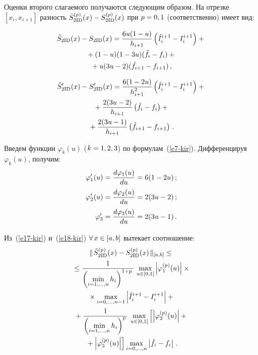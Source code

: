 \begin{multicols}{2}
  Оценки второго слагаемого получаются следующим образом. На отрезке 
$[x_i,x_{i+1}]$ разность $\tilde{S}^{(p)}_{2\mathrm{ID}}(x)\hm- S_{2\mathrm{ID}}^{(p)}(x)$ при 
$p\hm=0,1$ (соответственно) имеет вид:

\noindent 
  \begin{multline}
  \tilde{S}_{2\mathrm{ID}}(x) -S_{2\mathrm{ID}}(x) = \displaystyle\frac{\displaystyle 6u(1-u)\mathstrut}{\displaystyle h_{i+1}\mathstrut}\left( \hat{I}_i^{i+1} -
I_i^{i+1}\right) +{}\\
  {}+ (1-u)(1-3u) (\tilde{f}_i-f_i) +{}\\
  {}+u(3u-2) (\tilde{f}_{i+1}-f_{i+1})\,,
  \label{e17-kir}
  \end{multline}
  
  \vspace*{-12pt}
  
  \noindent
  \begin{multline}
  \tilde{S}^\prime_{2\mathrm{ID}}(x) -S^\prime_{2\mathrm{ID}}(x) = \displaystyle\frac{\displaystyle 6(1-2u)\mathstrut}{\displaystyle h^2_{i+1}\mathstrut}\left( 
\hat{I}_i^{i+1}-I_i^{i+1}\right) +{}\\
  {}+ \displaystyle\frac{\displaystyle 2(3u-2)\mathstrut}{\displaystyle h_{i+1}\mathstrut}\left(\tilde{f}_i-f_i\right) +{}\\
  {}+\displaystyle\frac{\displaystyle 2(3u-1)\mathstrut}{\displaystyle h_{i+1}\mathstrut} \left( 
\tilde{f}_{i+1}-f_{i+1}\right)\,.
  \label{e18-kir}
  \end{multline}

Введем функции $\varphi_k(u)$ ($k\hm=1,2,3$) по формулам~(\ref{e7-kir}). 
Дифференцируя $\varphi_k(u)$, получим:
\begin{align*}
\varphi_1^\prime(u) &= \displaystyle\frac{\displaystyle d\varphi_1(u)\mathstrut}{\displaystyle du\mathstrut}=6(1-2u)\,;\\
\varphi^\prime_2(u) &= \displaystyle\frac{\displaystyle d\varphi_2(u)\mathstrut}{\displaystyle du\mathstrut}=2(3u-2)\,;\\
\varphi^\prime_3 &= \displaystyle\frac{\displaystyle d\varphi_3(u)\mathstrut}{\displaystyle du\mathstrut}=2(3u-1)\,.
\end{align*}

Из~(\ref{e17-kir}) и~(\ref{e18-kir}) $\forall\,x \hm\in [a,b]$ вытекает 
соотношение: 
\begin{multline}
\parallel\! \tilde{S}^{(p)}_{2\mathrm{ID}}(x) -S^{(p)}_{2\mathrm{ID}}(x)\!\parallel_{[a,b]} \;\leq {}\\
{}\leq
\displaystyle\frac{\displaystyle 1\mathstrut}{\displaystyle \left( \min\limits_{i=1,\ldots , n} h_i\right)^{1+p}\mathstrut}\,\max\limits_{u\in [0,1]} 
\left\vert \varphi_1^{(p)}(u)\right\vert \times{}\\
{}\times \max\limits_{i=0,\ldots , n-1} \left\vert 
\hat{I}_i^{i+1}-I_i^{i+1}\right\vert+{}\\
{}+
\displaystyle\frac{\displaystyle 1\mathstrut}{\displaystyle \left(\min\limits_{i=1,\ldots , n} h_i\right)^{p}\mathstrut}\,\max\limits_{u\in [0,1]}\left[  
\left\vert \varphi_2^{(p)}(u)\right\vert +{}\right.\\
\left.{}+\left\vert \varphi_3^{(p)}(u)\right\vert \right] 
\max\limits_{i=0,\ldots , n}\left\vert \tilde{f}_i-f_i\right\vert\,.
\label{e19-kir}
\end{multline}


\end{multicols}
